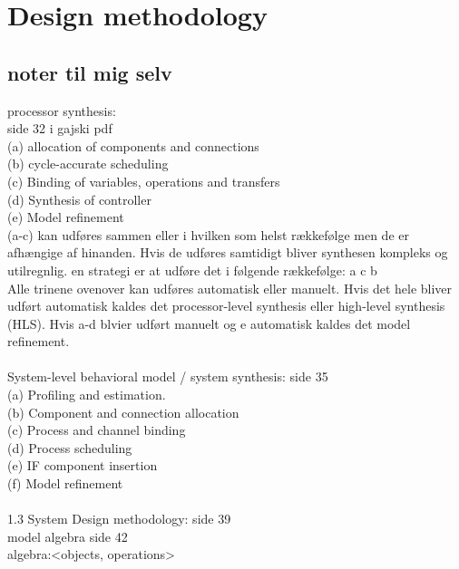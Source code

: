 \chapter{Design methodology} \label{ch:designmet}
\cite{gajski2009}

\color{gray}
\section*{noter til mig selv}
processor synthesis:\\
side 32 i gajski pdf \\
(a) allocation of components and connections \\
(b) cycle-accurate scheduling\\
(c) Binding of variables, operations and transfers\\
(d) Synthesis of controller\\
(e) Model refinement\\
(a-c) kan udføres sammen eller i hvilken som helst rækkefølge men de er afhængige af hinanden. Hvis de udføres samtidigt bliver synthesen kompleks og utilregnlig. en strategi er at udføre det i følgende rækkefølge: a c b\\
Alle trinene ovenover kan udføres automatisk eller manuelt. Hvis det hele bliver udført automatisk kaldes det processor-level synthesis eller high-level synthesis (HLS).  Hvis a-d blvier udført manuelt og e automatisk kaldes det model refinement.\\
\\
System-level behavioral model / system synthesis: side 35\\
(a) Profiling and estimation. \\
(b) Component and connection allocation\\
(c) Process and channel binding\\
(d) Process scheduling\\
(e) IF component insertion\\
(f) Model refinement\\
\\
1.3 System Design methodology: side 39 \\
model algebra side 42\\
algebra:<objects, operations>\\
